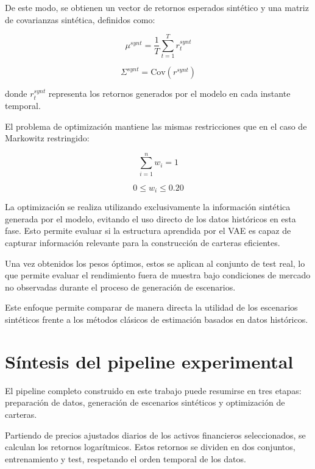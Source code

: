 De este modo, se obtienen un vector de retornos esperados sintético y una matriz de covarianzas sintética, definidos como:

\begin{equation}
\mu^{synt} = \frac{1}{T} \sum_{t=1}^{T} r_t^{synt}
\end{equation}

\begin{equation}
\Sigma^{synt} = \text{Cov}(r^{synt})
\end{equation}

donde $r_t^{synt}$ representa los retornos generados por el modelo en cada instante temporal.

El problema de optimización mantiene las mismas restricciones que en el caso de Markowitz restringido:

\begin{equation}
\sum_{i=1}^{n} w_i = 1
\end{equation}

\begin{equation}
0 \leq w_i \leq 0.20
\end{equation}

La optimización se realiza utilizando exclusivamente la información sintética generada por el modelo, evitando el uso directo de los datos históricos en esta fase. Esto permite evaluar si la estructura aprendida por el VAE es capaz de capturar información relevante para la construcción de carteras eficientes.

Una vez obtenidos los pesos óptimos, estos se aplican al conjunto de test real, lo que permite evaluar el rendimiento fuera de muestra bajo condiciones de mercado no observadas durante el proceso de generación de escenarios.

Este enfoque permite comparar de manera directa la utilidad de los escenarios sintéticos frente a los métodos clásicos de estimación basados en datos históricos.

\section{Síntesis del pipeline experimental}

El pipeline completo construido en este trabajo puede resumirse en tres etapas: preparación de datos, generación de escenarios sintéticos y optimización de carteras.

Partiendo de precios ajustados diarios de los activos financieros seleccionados, se calculan los retornos logarítmicos. Estos retornos se dividen en dos conjuntos, entrenamiento y test, respetando el orden temporal de los datos.

